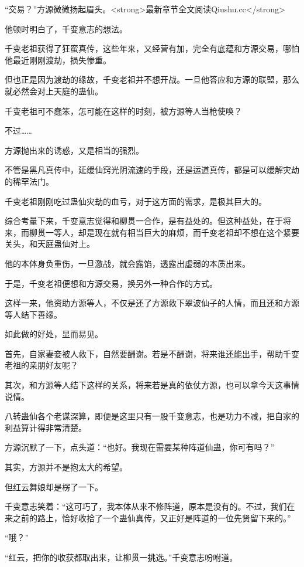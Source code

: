
\begin{this_body}

“交易？”方源微微扬起眉头。<strong>最新章节全文阅读Qiushu.cc</strong>

他顿时明白了，千变意志的想法。

千变老祖获得了狂蛮真传，这些年来，又经营有加，完全有底蕴和方源交易，哪怕他最近刚刚渡劫，损失惨重。

但也正是因为渡劫的缘故，千变老祖并不想开战。一旦他答应和方源的联盟，那么就必然会对上天庭的蛊仙。

千变老祖可不蠢笨，怎可能在这样的时刻，被方源等人当枪使唤？

不过……

方源抛出来的诱惑，又是相当的强烈。

不管是黑凡真传中，延缓仙窍光阴流速的手段，还是运道真传，都是可以缓解灾劫的稀罕法门。

千变老祖刚刚吃过蛊仙灾劫的血亏，对于这方面的需求，是极其巨大的。

综合考量下来，千变意志觉得和柳贯一合作，是有益处的。但这种益处，在于将来，而柳贯一等人，却是现在就有相当巨大的麻烦，而千变老祖却不想在这个紧要关头，和天庭蛊仙对上。

他的本体身负重伤，一旦激战，就会露馅，透露出虚弱的本质出来。

于是，千变老祖便想和方源交易，换另外一种合作的方式。

这样一来，他资助方源等人，不仅是还了方源救下翠波仙子的人情，而且还和方源等人结下善缘。

如此做的好处，显而易见。

首先，自家妻妾被人救下，自然要酬谢。若是不酬谢，将来谁还能出手，帮助千变老祖的亲朋好友呢？

其次，和方源等人结下这样的关系，将来若是真的依仗方源，也可以拿今天这事情说情。

八转蛊仙各个老谋深算，即便是这里只有一股千变意志，也是功力不减，把自家的利益算计得非常清楚。

方源沉默了一下，点头道：“也好。我现在需要某种阵道仙蛊，你可有吗？”

其实，方源并不是抱太大的希望。

但红云舞娘却是楞了一下。

千变意志笑着：“这可巧了，我本体从来不修阵道，原本是没有的。不过，我们在来之前的路上，恰好收拾了一个蛊仙真传，又正好是阵道的一位先贤留下来的。”

“哦？”

“红云，把你的收获都取出来，让柳贯一挑选。”千变意志吩咐道。


\end{this_body}

